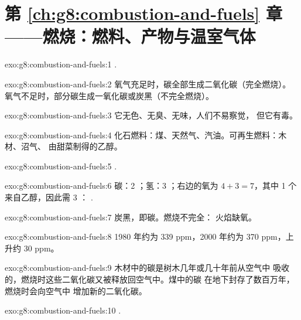 \section*{第 \ref{ch:g8:combustion-and-fuels} 章——燃烧：燃料、产物与温室气体}

\begin{solution}{exo:g8:combustion-and-fuels:1}
.
\end{solution}

\begin{solution}{exo:g8:combustion-and-fuels:2}
氧气充足时，碳全部生成二氧化碳（完全燃烧）。
氧气不足时，部分碳生成一氧化碳或炭黑（不完全燃烧）。
\end{solution}

\begin{solution}{exo:g8:combustion-and-fuels:3}
它无色、无臭、无味，人们不易察觉，
但它有毒。
\end{solution}

\begin{solution}{exo:g8:combustion-and-fuels:4}
化石燃料：煤、天然气、汽油。可再生燃料：木材、沼气、
由甜菜制得的乙醇。
\end{solution}

\begin{solution}{exo:g8:combustion-and-fuels:5}
.
\end{solution}

\begin{solution}{exo:g8:combustion-and-fuels:6}
碳：2 ；氢：3 ；右边的氧为 $4 + 3 =
7$，其中 1 个来自乙醇，因此需 3 ：
.
\end{solution}

\begin{solution}{exo:g8:combustion-and-fuels:7}
炭黑，即碳。燃烧不完全：
火焰缺氧。
\end{solution}

\begin{solution}{exo:g8:combustion-and-fuels:8}
1980 年约为 339 ppm，2000 年约为 370 ppm，上升约 30 ppm。
\end{solution}

\begin{solution}{exo:g8:combustion-and-fuels:9}
木材中的碳是树木几年或几十年前从空气中
吸收的，燃烧时这些二氧化碳又被释放回空气中。煤中的碳
在地下封存了数百万年，燃烧时会向空气中
增加新的二氧化碳。
\end{solution}

\begin{solution}{exo:g8:combustion-and-fuels:10}
.
\end{solution}

